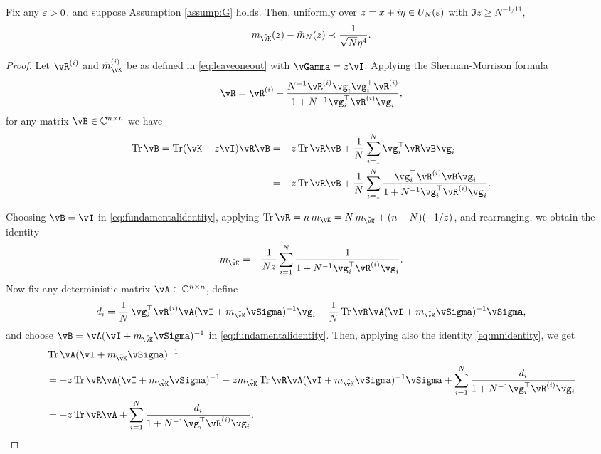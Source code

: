 \begin{lemma}\label{lemma:prelimestimate}
Fix any $\varepsilon>0$, and suppose Assumption \ref{assump:G} holds.
Then, uniformly over $z=x+i\eta \in U_N(\varepsilon)$ with $\Im z \geq N^{-1/11}$,
\[m_{\tilde \vK}(z)-\tilde m_N(z) \prec \frac{1}{\sqrt{N}\eta^4}.\]
\end{lemma}
\begin{proof}
Let $\vR^{(i)}$ and $\tilde m_{\vK}^{(i)}$ be as defined in
\eqref{eq:leaveoneout} with $\vGamma=z\vI$.
Applying the Sherman-Morrison formula
\begin{equation}\label{eq:ShermanMorrison}
\vR=\vR^{(i)}-\frac{N^{-1} \vR^{(i)}\vg_i\vg_i^\top \vR^{(i)}}
{1+N^{-1}\vg_i^\top \vR^{(i)}\vg_i},
\end{equation}
for any matrix $\vB \in \C^{n \times n}$ we have
\begin{align}
\Tr \vB=\Tr (\vK-z\vI)\vR\vB
&=-z\Tr \vR\vB+\frac{1}{N}\sum_{i=1}^N \vg_i^\top \vR\vB\vg_i\nonumber\\
&=-z\Tr \vR\vB+\frac{1}{N}\sum_{i=1}^N \frac{\vg_i^\top \vR^{(i)}\vB\vg_i}
{1+N^{-1}\vg_i^\top \vR^{(i)}\vg_i}.\label{eq:fundamentalidentity}
\end{align}

Choosing $\vB=\vI$ in \eqref{eq:fundamentalidentity},
applying $\Tr \vR=n\,m_{\vK} =N\,m_{\tilde \vK}+(n-N)(-1/z)$, and rearranging,
we obtain the identity
\begin{equation}\label{eq:mnidentity}
m_{\tilde \vK}=-\frac{1}{Nz}\sum_{i=1}^N \frac{1}{1+N^{-1} \vg_i^\top
\vR^{(i)}\vg_i}.
\end{equation}
Now fix any deterministic matrix $\vA \in \C^{n \times n}$, define
\[d_i=\frac{1}{N}\,\vg_i^\top \vR^{(i)}\vA
(\vI+m_{\tilde \vK}\vSigma)^{-1}\vg_i
-\frac{1}{N}\Tr \vR\vA(\vI+m_{\tilde \vK}\vSigma)^{-1}\vSigma,\]
and choose $\vB=\vA(\vI+m_{\tilde \vK}\vSigma)^{-1}$
in \eqref{eq:fundamentalidentity}. Then, applying also the identity
\eqref{eq:mnidentity}, we get
\begin{align}
&\Tr \vA(\vI+m_{\tilde \vK}\vSigma)^{-1}\nonumber\\
&=-z\Tr \vR\vA(\vI+m_{\tilde \vK}\vSigma)^{-1}
-zm_{\tilde \vK} \Tr \vR\vA(\vI+m_{\tilde \vK}\vSigma)^{-1}\vSigma
+\sum_{i=1}^N \frac{d_i}{1+N^{-1}\vg_i^\top \vR^{(i)}\vg_i}\nonumber\\
&=-z \Tr \vR\vA+\sum_{i=1}^N \frac{d_i}{1+N^{-1}\vg_i^\top \vR^{(i)}\vg_i}.
\label{eq:detequividentity}
\end{align}


\end{proof}
